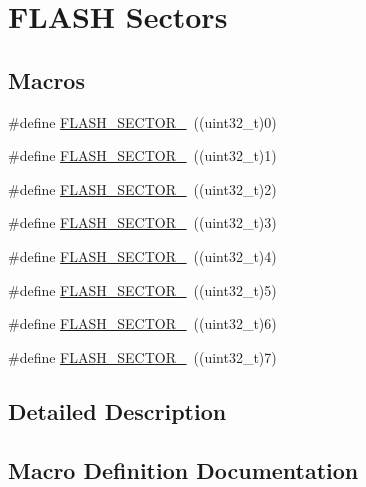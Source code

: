 \hypertarget{group___f_l_a_s_h_ex___sectors}{}\section{F\+L\+A\+SH Sectors}
\label{group___f_l_a_s_h_ex___sectors}
\subsection*{Macros}
\begin{DoxyCompactItemize}
\item 
\#define \hyperlink{group___f_l_a_s_h_ex___sectors_ga15a8729b9c5eb83d46d5f437cd46d874}{F\+L\+A\+S\+H\+\_\+\+S\+E\+C\+T\+O\+R\+\_}~((uint32\+\_\+t)0)
\item 
\#define \hyperlink{group___f_l_a_s_h_ex___sectors_ga2a85d94366030ea8328796169c1bc300}{F\+L\+A\+S\+H\+\_\+\+S\+E\+C\+T\+O\+R\+\_}~((uint32\+\_\+t)1)
\item 
\#define \hyperlink{group___f_l_a_s_h_ex___sectors_ga58999952d63fd45dd86b0817ad2a5bae}{F\+L\+A\+S\+H\+\_\+\+S\+E\+C\+T\+O\+R\+\_}~((uint32\+\_\+t)2)
\item 
\#define \hyperlink{group___f_l_a_s_h_ex___sectors_gab0a0ce95752a56b430c809a88812fed2}{F\+L\+A\+S\+H\+\_\+\+S\+E\+C\+T\+O\+R\+\_}~((uint32\+\_\+t)3)
\item 
\#define \hyperlink{group___f_l_a_s_h_ex___sectors_gac1338c8f4ab3ae74d212c59c7e9e4cc6}{F\+L\+A\+S\+H\+\_\+\+S\+E\+C\+T\+O\+R\+\_}~((uint32\+\_\+t)4)
\item 
\#define \hyperlink{group___f_l_a_s_h_ex___sectors_gad8736215a8d3ce115f4281a6d026d0f8}{F\+L\+A\+S\+H\+\_\+\+S\+E\+C\+T\+O\+R\+\_}~((uint32\+\_\+t)5)
\item 
\#define \hyperlink{group___f_l_a_s_h_ex___sectors_gaa0d1fc04e5918186ac9c228ab4172606}{F\+L\+A\+S\+H\+\_\+\+S\+E\+C\+T\+O\+R\+\_}~((uint32\+\_\+t)6)
\item 
\#define \hyperlink{group___f_l_a_s_h_ex___sectors_ga99693b9e0816fdb8706218bc845724ad}{F\+L\+A\+S\+H\+\_\+\+S\+E\+C\+T\+O\+R\+\_}~((uint32\+\_\+t)7)
\end{DoxyCompactItemize}


\subsection{Detailed Description}


\subsection{Macro Definition Documentation}

